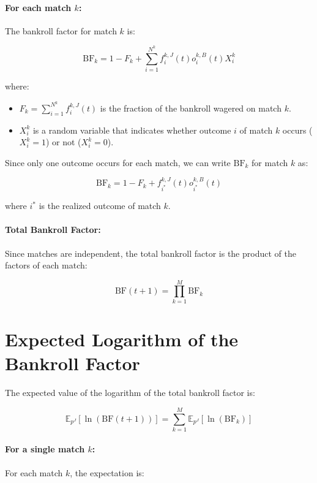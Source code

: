 \paragraph{For each match \( k \):}

The bankroll factor for match \( k \) is:

\[
\text{BF}_k = 1 - F_k + \sum_{i=1}^{N^k} f_i^{k,J}(t) o_i^{k,B}(t) X_i^k
\]

where:
\begin{itemize}
\item \( F_k = \sum_{i=1}^{N^k} f_i^{k,J}(t) \) is the fraction of the bankroll wagered on match \( k \).
\item \( X_i^k \) is a random variable that indicates whether outcome \( i \) of match \( k \) occurs (\( X_i^k = 1 \)) or not (\( X_i^k = 0 \)).
\end{itemize}

Since only one outcome occurs for each match, we can write \( \text{BF}_k \) for match \( k \) as:

\[
\text{BF}_k = 1 - F_k + f_{i^*}^{k,J}(t) o_{i^*}^{k,B}(t)
\]

where \( i^* \) is the realized outcome of match \( k \).

\paragraph{Total Bankroll Factor:}

Since matches are independent, the total bankroll factor is the product of the factors of each match:

\[
\text{BF}(t+1) = \prod_{k=1}^M \text{BF}_k
\]

\section{Expected Logarithm of the Bankroll Factor}

The expected value of the logarithm of the total bankroll factor is:

\[
\mathbb{E}_{p^{J}}\left[ \ln\left( \text{BF}(t+1) \right) \right] = \sum_{k=1}^M \mathbb{E}_{p^{J}}\left[ \ln\left( \text{BF}_k \right) \right]
\]

\paragraph{For a single match \( k \):}

For each match \( k \), the expectation is:

